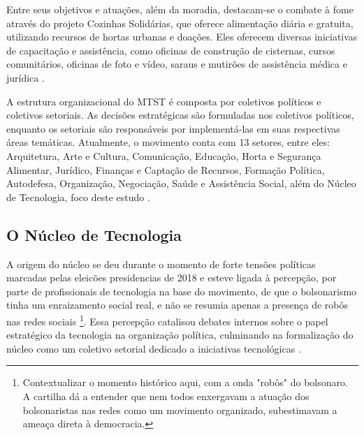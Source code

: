 Entre seus objetivos e atuações, além da moradia, destacam-se o combate à fome através do projeto Cozinhas Solidárias, que oferece alimentação diária e gratuita, utilizando recursos de hortas urbanas e doações. Eles oferecem diversas iniciativas de capacitação e assistência, como oficinas de construção de cisternas, cursos comunitários, oficinas de foto e vídeo, saraus e mutirões de assistência médica e jurídica \cite{mtst2023cartilha}.

A estrutura organizacional do MTST é composta por coletivos políticos e coletivos setoriais. As decisões estratégicas são formuladas nos coletivos políticos, enquanto os setoriais são responsáveis por implementá-las em suas respectivas áreas temáticas. Atualmente, o movimento conta com 13 setores, entre eles: Arquitetura, Arte e Cultura, Comunicação, Educação, Horta e Segurança Alimentar, Jurídico, Finanças e Captação de Recursos, Formação Política, Autodefesa, Organização, Negociação, Saúde e Assistência Social, além do Núcleo de Tecnologia, foco deste estudo \cite{mtst2023cartilha}.


\subsection{O Núcleo de Tecnologia}
\label{subsec:nucleotec}

A origem do núcleo se deu durante o momento de forte tensões políticas marcadas pelas eleicões presidencias de 2018 e esteve ligada à percepção, por parte de profissionais de tecnologia na base do movimento, de que o bolsonarismo tinha um enraizamento social real, e não se resumia apenas a presença de robôs nas redes sociais \footnote{Contextualizar o momento histórico aqui, com a onda "robôs" do bolsonaro. A cartilha dá a entender que nem todos enxergavam a atuação dos bolsonaristas nas redes como um movimento organizado, subestimavam a ameaça direta à democracia. }. Essa percepção catalisou debates internos sobre o papel estratégico da tecnologia na organização política, culminando na formalização do núcleo como um coletivo setorial dedicado a iniciativas tecnológicas \cite{mtst2023cartilha}.


